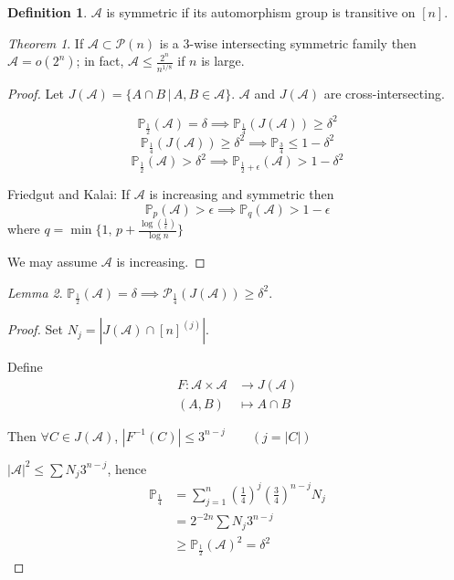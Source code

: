 \documentclass[a4paper]{article}
\theoremstyle{definition}
\newtheorem*{definition}{Definition}
\theoremstyle{remark}
\theoremstyle{default}
\newtheorem{theorem}{Theorem}
\newtheorem{lemma}[theorem]{Lemma}
\newcommand*\abs[1]{\left|#1\right|}
\begin{document}
\begin{definition}
	$\mathcal{A}$ is symmetric if its automorphism group is transitive on $[n]$.
\end{definition}

\begin{theorem}
	If $\mathcal{A} \subset \mathcal{P}(n)$ is a 3-wise intersecting symmetric family then $\mathcal{A}=o(2^n)$;
	in fact, $\mathcal{A} \leq \frac{2^n}{n^{1/8}}$ if $n$ is large.
\end{theorem}
\begin{proof}\renewcommand{\qedsymbol}{}
	Let $J(\mathcal{A}) = \{A \cap B \,|\, A,B \in \mathcal{A}\}$.
	$\mathcal{A}$ and $J(\mathcal{A})$ are cross-intersecting.
	
	$$\mathbb{P}_{\frac{1}{2}}(\mathcal{A}) = \delta \implies \mathbb{P}_{\frac{1}{4}}(J(\mathcal{A})) \geq \delta^2$$
	$$\mathbb{P}_{\frac{1}{4}}(J(\mathcal{A})) \geq \delta^2 \implies \mathbb{P}_{\frac{3}{4}} \leq 1-\delta^2$$
	$$\mathbb{P}_{\frac{1}{2}}(\mathcal{A}) > \delta^2 \implies \mathbb{P}_{\frac{1}{2}+\epsilon}(\mathcal{A}) > 1-\delta^2$$
	
	Friedgut and Kalai:
	If $\mathcal{A}$ is increasing and symmetric then
	$$\mathbb{P}_p(\mathcal{A}) > \epsilon \implies \mathbb{P}_q(\mathcal{A}) > 1-\epsilon$$
	where $q = \min\{1,\, p+\frac{\log(\frac{1}{\epsilon})}{\log n}\}$
	
	We may assume $\mathcal{A}$ is increasing.
\end{proof}

\begin{lemma}
	$\mathbb{P}_{\frac{1}{2}}(\mathcal{A}) = \delta \implies \mathcal{P}_{\frac{1}{4}}(J(\mathcal{A})) \geq \delta^2$.
	\label{74}
\end{lemma}
\begin{proof}
	Set $N_j = \abs{J(\mathcal{A}) \cap [n]^{(j)}}$.
	
	Define
	\begin{align*}
	F: \mathcal{A} \times \mathcal{A} &\to J(\mathcal{A}) \\
	(A, B) &\mapsto A \cap B
	\end{align*}
	
	Then $\forall C \in J(\mathcal{A})$, $\abs{F^{-1}(C)} \leq 3^{n-j} \qquad (j=\abs{C})$
	
	$\abs{\mathcal{A}}^2 \leq \sum N_j 3^{n-j}$, hence
	\begin{align*}
		\mathbb{P}_{\frac{1}{4}} &= \sum_{j=1}^n \left(\frac{1}{4}\right)^j \left(\frac{3}{4}\right)^{n-j}N_j \\
		&= 2^{-2n}\sum N_j 3^{n-j} \\
		& \geq \mathbb{P}_{\frac{1}{2}}(\mathcal{A})^2 = \delta^2
	\end{align*}
\end{proof}
\end{document}
